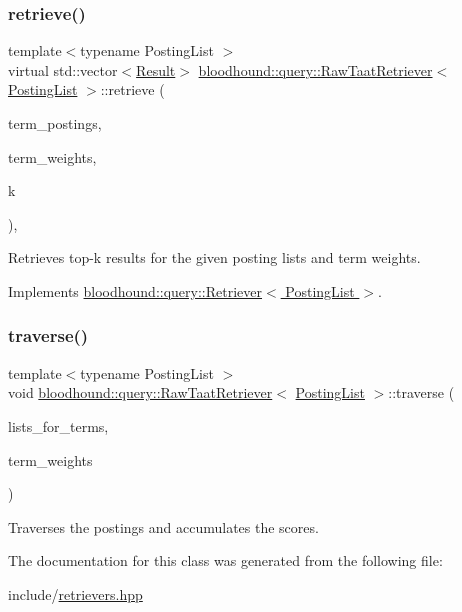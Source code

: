 \subsubsection{\texorpdfstring{retrieve()}{retrieve()}}
{\footnotesize\ttfamily template$<$typename Posting\+List $>$ \\
virtual std\+::vector$<$\hyperlink{structbloodhound_1_1query_1_1Result}{Result}$>$ \hyperlink{classbloodhound_1_1query_1_1RawTaatRetriever}{bloodhound\+::query\+::\+Raw\+Taat\+Retriever}$<$ \hyperlink{classbloodhound_1_1PostingList}{Posting\+List} $>$\+::retrieve (\begin{DoxyParamCaption}\item[{const std\+::vector$<$ \hyperlink{classbloodhound_1_1PostingList}{Posting\+List} $>$ \&}]{term\+\_\+postings,  }\item[{const std\+::vector$<$ \hyperlink{structbloodhound_1_1Score}{Score} $>$ \&}]{term\+\_\+weights,  }\item[{std\+::size\+\_\+t}]{k }\end{DoxyParamCaption})\hspace{0.3cm}{\ttfamily [inline]}, {\ttfamily [virtual]}}



Retrieves top-\/k results for the given posting lists and term weights. 



Implements \hyperlink{classbloodhound_1_1query_1_1Retriever_ae3c6a4628c5580e620c213b3dcd47c2b}{bloodhound\+::query\+::\+Retriever$<$ Posting\+List $>$}.

\mbox{\label{classbloodhound_1_1query_1_1RawTaatRetriever_a70007a6dd5213e9c28266e38b424ba20}} 
\subsubsection{\texorpdfstring{traverse()}{traverse()}}
{\footnotesize\ttfamily template$<$typename Posting\+List $>$ \\
void \hyperlink{classbloodhound_1_1query_1_1RawTaatRetriever}{bloodhound\+::query\+::\+Raw\+Taat\+Retriever}$<$ \hyperlink{classbloodhound_1_1PostingList}{Posting\+List} $>$\+::traverse (\begin{DoxyParamCaption}\item[{const std\+::vector$<$ \hyperlink{classbloodhound_1_1PostingList}{Posting\+List} $>$ \&}]{lists\+\_\+for\+\_\+terms,  }\item[{const std\+::vector$<$ \hyperlink{structbloodhound_1_1Score}{Score} $>$ \&}]{term\+\_\+weights }\end{DoxyParamCaption})\hspace{0.3cm}{\ttfamily [inline]}}



Traverses the postings and accumulates the scores. 



The documentation for this class was generated from the following file\+:\begin{DoxyCompactItemize}
\item 
include/\hyperlink{retrievers_8hpp}{retrievers.\+hpp}\end{DoxyCompactItemize}
